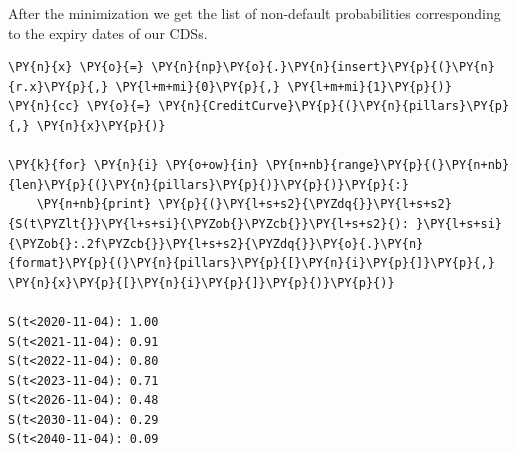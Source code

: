 After the minimization we get the list of non-default probabilities corresponding to the expiry dates of our CDSs.

\begin{codebox}
\begin{Verbatim}[commandchars=\\\{\}]
\PY{n}{x} \PY{o}{=} \PY{n}{np}\PY{o}{.}\PY{n}{insert}\PY{p}{(}\PY{n}{r.x}\PY{p}{,} \PY{l+m+mi}{0}\PY{p}{,} \PY{l+m+mi}{1}\PY{p}{)}
\PY{n}{cc} \PY{o}{=} \PY{n}{CreditCurve}\PY{p}{(}\PY{n}{pillars}\PY{p}{,} \PY{n}{x}\PY{p}{)}
	
\PY{k}{for} \PY{n}{i} \PY{o+ow}{in} \PY{n+nb}{range}\PY{p}{(}\PY{n+nb}{len}\PY{p}{(}\PY{n}{pillars}\PY{p}{)}\PY{p}{)}\PY{p}{:}
    \PY{n+nb}{print} \PY{p}{(}\PY{l+s+s2}{\PYZdq{}}\PY{l+s+s2}{S(t\PYZlt{}}\PY{l+s+si}{\PYZob{}\PYZcb{}}\PY{l+s+s2}{): }\PY{l+s+si}{\PYZob{}:.2f\PYZcb{}}\PY{l+s+s2}{\PYZdq{}}\PY{o}{.}\PY{n}{format}\PY{p}{(}\PY{n}{pillars}\PY{p}{[}\PY{n}{i}\PY{p}{]}\PY{p}{,} \PY{n}{x}\PY{p}{[}\PY{n}{i}\PY{p}{]}\PY{p}{)}\PY{p}{)}

S(t<2020-11-04): 1.00
S(t<2021-11-04): 0.91
S(t<2022-11-04): 0.80
S(t<2023-11-04): 0.71
S(t<2026-11-04): 0.48
S(t<2030-11-04): 0.29
S(t<2040-11-04): 0.09
\end{Verbatim}
\end{codebox}


